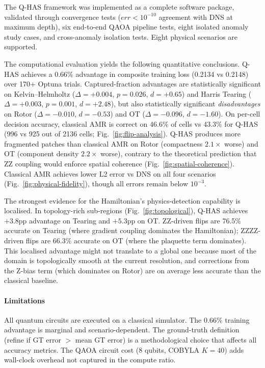 \documentclass[12pt, a4paper, oneside]{report}
\begin{document}
The Q-HAS framework was implemented as a complete software package, validated through convergence tests ($err < 10^{-10}$ agreement with DNS at maximum depth), six end-to-end QAOA pipeline tests, eight isolated anomaly study cases, and cross-anomaly isolation tests. Eight physical scenarios are supported.

The computational evaluation yields the following quantitative conclusions.  Q-HAS achieves a 0.66\% advantage in composite training loss (0.2134 vs 0.2148) over 170+ Optuna trials.  Captured-fraction advantages are statistically significant on Kelvin--Helmholtz ($\Delta = +0.004$, $p = 0.026$, $d = +0.65$) and Harris Tearing ($\Delta = +0.003$, $p = 0.001$, $d = +2.48$), but also statistically significant \textit{disadvantages} on Rotor ($\Delta = -0.010$, $d = -0.53$) and OT ($\Delta = -0.096$, $d = -1.60$).  On per-cell decision accuracy, classical AMR is correct on 46.6\% of cells vs 43.3\% for Q-HAS (996 vs 925 out of 2136 cells; Fig.~\ref{fig:flip-analysis}).  Q-HAS produces more fragmented patches than classical AMR on Rotor (compactness $2.1\times$ worse) and OT (component density $2.2\times$ worse), contrary to the theoretical prediction that ZZ coupling would enforce spatial coherence (Fig.~\ref{fig:spatial-coherence}).  Classical AMR achieves lower L2 error vs DNS on all four scenarios (Fig.~\ref{fig:physical-fidelity}), though all errors remain below $10^{-3}$.

The strongest evidence for the Hamiltonian's physics-detection capability is localised.  In topology-rich sub-regions (Fig.~\ref{fig:topological}), Q-HAS achieves $+3.8$pp advantage on Tearing and $+5.3$pp on OT.  ZZ-driven flips are 76.5\% accurate on Tearing (where gradient coupling dominates the Hamiltonian); ZZZZ-driven flips are 66.3\% accurate on OT (where the plaquette term dominates). This localised advantage might not translate to a global one because most of the domain is topologically smooth at the current resolution, and corrections from the Z-bias term (which dominates on Rotor) are on average less accurate than the classical baseline.

\paragraph{Limitations}
All quantum circuits are executed on a classical simulator. The 0.66\% training advantage is marginal and scenario-dependent. The ground-truth definition (refine if GT error $>$ mean GT error) is a methodological choice that affects all accuracy metrics. The QAOA circuit cost (8 qubits, COBYLA $K = 40$) adds wall-clock overhead not captured in the compute ratio.
\end{document}
